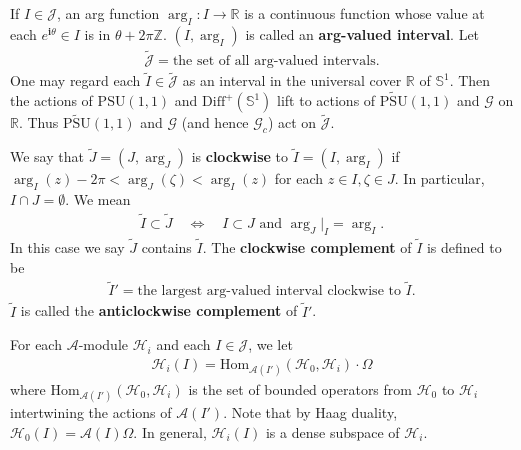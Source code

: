 \documentclass[11pt,b5paper,notitlepage]{article}
\theoremstyle{definition}
\theoremstyle{plain}
\newcommand{\mc}{\mathcal}
\newcommand{\wtd}{\widetilde}
\newcommand{\Hom}{\mathrm{Hom}}
\newcommand{\Diffp}{\mathrm{Diff}^+}
\newcommand{\PSU}{\mathrm{PSU}(1,1)}
\newcommand{\scr}{\mathscr}
\newcommand{\Jtd}{\widetilde{\mathcal J}}
\newcommand{\im}{\mathbf{i}}
\newcommand{\Zbb}{\mathbb Z}
\newcommand{\Rbb}{\mathbb R}
\newcommand{\UPSU}{\widetilde{\mathrm{PSU}}(1,1)}
\newcommand{\Sbb}{{\mathbb S}}
\newcommand{\Gc}{\mathscr G_c}
\numberwithin{equation}{section}
\begin{document}
If $I\in\mc J$, an arg function $\arg_I:I\rightarrow\Rbb$ is a continuous function whose value at each $e^{\im\theta}\in I$ is in $\theta+2\pi\Zbb$. $(I,\arg_I)$ is called an \textbf{arg-valued interval}. Let
\begin{align*}
\Jtd=\text{the set of all arg-valued intervals}.	
\end{align*}
One may regard each $\wtd I\in\Jtd$ as an interval in the universal cover $\Rbb$ of $\Sbb^1$. Then the actions of $\PSU$ and $\Diffp(\Sbb^1)$ lift to actions of $\UPSU$ and $\scr G$ on $\Rbb$. Thus $\UPSU$ and $\scr G$ (and hence $\Gc$) act on $\Jtd$.  

We say that $\wtd J=(J,\arg_J)$ is \textbf{clockwise} to $\wtd I=(I,\arg_I)$ if   $\arg_I(z)-2\pi<\arg_J(\zeta)<\arg_I(z)$ for each $z\in I,\zeta\in J$. In particular, $I\cap J=\emptyset$. We mean
\begin{align*}
\wtd I	\subset\wtd J\quad\Leftrightarrow\quad \text{$I\subset J$ and $\arg_J|_I=\arg_I$}.
\end{align*}
In this case we say $\wtd J$ contains $\wtd I$. The \textbf{clockwise complement} of $\wtd I$ is defined to be
\begin{align*}
	\wtd I'=\text{the largest arg-valued interval clockwise to $\wtd I$}.
\end{align*} 
$\wtd I$ is called the \textbf{anticlockwise complement} of $\wtd I'$.





For each $\mc A$-module $\mc H_i$ and each $I\in\mc J$, we let
\begin{align*}
\mc H_i(I)=\Hom_{\mc A(I')}(\mc H_0,\mc H_i)\cdot\Omega
\end{align*}
where $\Hom_{\mc A(I')}(\mc H_0,\mc H_i)$ is the set of bounded operators from $\mc H_0$ to $\mc H_i$ intertwining the actions of $\mc A(I')$. Note that by Haag duality, $\mc H_0(I)=\mc A(I)\Omega$. In general,  $\mc H_i(I)$ is a dense subspace of $\mc H_i$.
\end{document}
